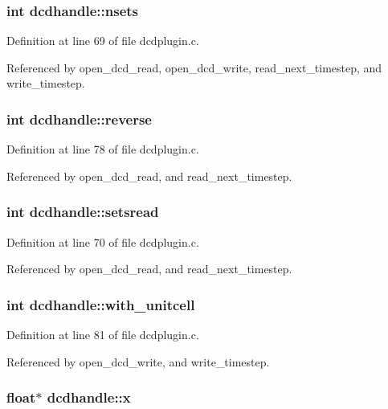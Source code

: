 \subsubsection{\setlength{\rightskip}{0pt plus 5cm}int dcdhandle::nsets}\label{structdcdhandle_m2}




Definition at line 69 of file dcdplugin.c.

Referenced by open\_\-dcd\_\-read, open\_\-dcd\_\-write, read\_\-next\_\-timestep, and write\_\-timestep.
\subsubsection{\setlength{\rightskip}{0pt plus 5cm}int dcdhandle::reverse}\label{structdcdhandle_m13}




Definition at line 78 of file dcdplugin.c.

Referenced by open\_\-dcd\_\-read, and read\_\-next\_\-timestep.
\subsubsection{\setlength{\rightskip}{0pt plus 5cm}int dcdhandle::setsread}\label{structdcdhandle_m3}




Definition at line 70 of file dcdplugin.c.

Referenced by open\_\-dcd\_\-read, and read\_\-next\_\-timestep.
\subsubsection{\setlength{\rightskip}{0pt plus 5cm}int dcdhandle::with\_\-unitcell}\label{structdcdhandle_m16}




Definition at line 81 of file dcdplugin.c.

Referenced by open\_\-dcd\_\-write, and write\_\-timestep.
\subsubsection{\setlength{\rightskip}{0pt plus 5cm}float$\ast$ dcdhandle::x}\label{structdcdhandle_m8}




